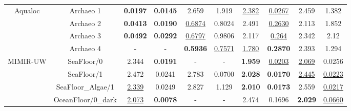 \begin{table*}[ht!]
{\begin{tabular}{cccccccccc}
\midrule
\multirow{4}{*}{Aqualoc \cite{dataset:aqualocdb}} 
                                & Archaeo 1   & \textbf{0.0197} & \textbf{0.0145}  &  2.659  & 1.919   & \underline{2.382}  & \underline{0.0267} & 2.459  & 1.382  \\
                                & Archaeo 2   & \textbf{0.0413} & \textbf{0.0190} & \underline{0.6874} & 0.8024  & 2.491 & \underline{0.2630} & 2.113  & 1.852  \\
                                & Archaeo 3   & \textbf{0.0492} & \textbf{0.0292} &  \underline{0.6797}  & 0.9806  & 2.117  & \underline{0.264} & 2.342  & 2.12  \\
                                & Archaeo 4   & -      &  -      & \textbf{0.5936} &  \underline{0.7571} & \underline{1.780} & \textbf{0.2870} & 2.393 & 1.294\\
\midrule
\multirow{4}{*}{MIMIR-UW \cite{dataset:mimir}} 
                                & SeaFloor/0       & 2.344 & \textbf{0.0191} &  -  & -   &  \textbf{1.959}  & \underline{0.0203} & \underline{2.069} & 0.0256  \\
                                & SeaFloor/1       & 2.472 &  0.0241 & 2.783 & 0.0700 &  \textbf{2.028}  & \textbf{0.0170} & \underline{2.445} & \underline{0.0223} \\
                                & SeaFloor\_Algae/1     & \underline{2.339} & 0.0249 & 2.827 & 1.129 &  \textbf{2.010}  & \textbf{0.0173} & 2.559 & \underline{0.0217} \\
                                & OceanFloor/0\_dark & \underline{2.073} & \textbf{0.0078}   &  - & - &  2.474  & 0.1696 & \textbf{2.029} &  \underline{0.0660}  \\

\bottomrule

\end{tabular}}
\end{table*}